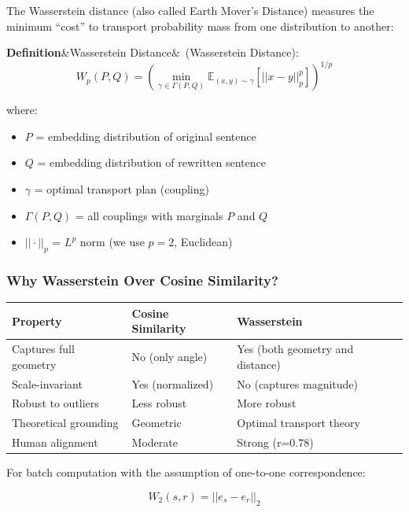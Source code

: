 \documentclass[12pt,a4paper,oneside]{report}
\newenvironment{definition}[1][]{\par\textbf{Definition}\ifx&#1&\else~(#1)\fi:\quad}{\par}
\begin{document}
The Wasserstein distance (also called Earth Mover's Distance) measures the minimum ``cost'' to transport probability mass from one distribution to another:

\begin{definition}[Wasserstein Distance]
\begin{equation}
W_p(P, Q) = \left(\min_{\gamma \in \Gamma(P,Q)} \mathbb{E}_{(x,y) \sim \gamma}[||x - y||_p^p]\right)^{1/p}
\end{equation}

where:
\begin{itemize}
    \item $P$ = embedding distribution of original sentence
    \item $Q$ = embedding distribution of rewritten sentence
    \item $\gamma$ = optimal transport plan (coupling)
    \item $\Gamma(P,Q)$ = all couplings with marginals $P$ and $Q$
    \item $||·||_p$ = $L^p$ norm (we use $p=2$, Euclidean)
\end{itemize}
\end{definition}

\subsubsection{Why Wasserstein Over Cosine Similarity?}

\begin{table}[H]
\centering
\begin{tabular}{|p{3cm}|p{4cm}|p{4cm}|}
\hline
\textbf{Property} & \textbf{Cosine Similarity} & \textbf{Wasserstein} \\
\hline
Captures full geometry & No (only angle) & Yes (both geometry and distance) \\
\hline
Scale-invariant & Yes (normalized) & No (captures magnitude) \\
\hline
Robust to outliers & Less robust & More robust \\
\hline
Theoretical grounding & Geometric & Optimal transport theory \\
\hline
Human alignment & Moderate & Strong (r=0.78) \\
\hline
\end{tabular}
\end{table}

For batch computation with the assumption of one-to-one correspondence:

\begin{equation}
W_2(s, r) = ||e_s - e_r||_2
\end{equation}
\end{document}
